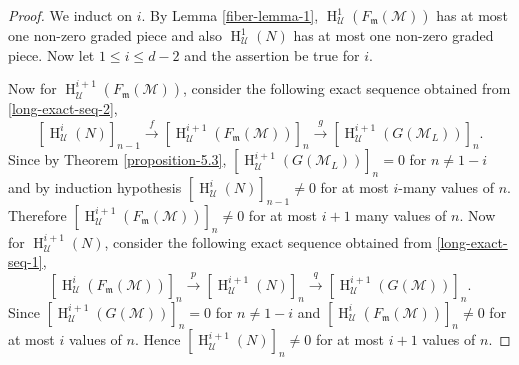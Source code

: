 \documentclass[11pt,reqno]{amsart}
\theoremstyle{definition}
\newcommand{\m}{\mathfrak m}
\def\U{{\mathcal U}}
\def\M{{\mathcal M}}
\DeclareMathOperator{\h}{H}
\numberwithin{equation}{section}
\begin{document}
\begin{proof}
   We induct on $ i$. By Lemma \ref{fiber-lemma-1}, $\h^1_\U(F_\m(\M))$ has at most one non-zero graded piece and also $\h^1_\U(N)$ has at most one non-zero graded piece. Now let $1\leq i\leq d-2$ and the assertion be true for $i$. 
 

    Now  for $\h^{i+1}_\mathcal{U}(F_\m(\M))$, consider the following exact sequence obtained from \eqref{long-exact-seq-2}, 
    \begin{equation}\label{8.2-induced}
        [ \h^i_{\mathcal{U}}(N)]_{n-1}\xrightarrow{f}[\h^{i+1}_{\U}(F_\m(\M))]_n\xrightarrow{g} [\h^{i+1}_{\mathcal{U}}(G(\M_L))]_n.
    \end{equation}    
    Since by Theorem \ref{proposition-5.3}, $[\h^{i+1}_{\mathcal{U}}(G(\M_L))]_n=0$ for $n\neq 1-i$ and by induction hypothesis $[\h^i_{\mathcal{U}}(N)]_{n-1}\neq 0$ for at most $i$-many values of $n$. Therefore $[\h^{i+1}_{\U}(F_\m(\M))]_n\neq0$ for at most $i+1$ many values of $n.$
    Now for $\h_\U^{i+1}(N)$, consider the following exact sequence obtained from \eqref{long-exact-seq-1},  
    \begin{equation}\label{8.3-induced}
      [\h^i_{\U}(F_\m(\M))]_n\xrightarrow{p}[\h^{i+1}_{\U}(N)]_n\xrightarrow{q}[\h^{i+1}_{\mathcal{U}}(G(\M))]_n.   
    \end{equation}
    Since $[\h^{i+1}_\U(G(\M))]_n=0$ for $n\neq 1-i$ and $[\h^i_\U(F_\m(\M))]_n\neq 0$ for at most $i$ values of $n.$ Hence $[\h^{i+1}_\U(N)]_n\neq 0$ for at most $i+1$ values of $n.$ 
\end{proof}
\end{document}
